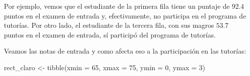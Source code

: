 \documentclass[
  letterpaper,
  DIV=11,
  numbers=noendperiod,
  oneside]{scrreprt}
\newenvironment{Shaded}{\begin{snugshade}}{\end{snugshade}}
\newcommand{\AttributeTok}[1]{\textcolor[rgb]{0.40,0.45,0.13}{#1}}
\newcommand{\DecValTok}[1]{\textcolor[rgb]{0.68,0.00,0.00}{#1}}
\newcommand{\FunctionTok}[1]{\textcolor[rgb]{0.28,0.35,0.67}{#1}}
\newcommand{\NormalTok}[1]{\textcolor[rgb]{0.00,0.23,0.31}{#1}}
\newcommand{\OtherTok}[1]{\textcolor[rgb]{0.00,0.23,0.31}{#1}}
\begin{document}
Por ejemplo, vemos que el estudiante de la primera fila tiene un puntaje
de \(92.4\) puntos en el examen de entrada y, efectivamente, no
participa en el programa de tutorías. Por otro lado, el estudiante de la
tercera fila, con sus magros \(53.7\) puntos en el examen de entrada, sí
participó del programa de tutorías.

Veamos las notas de entrada y como afecta eso a la participación en las
tutorías:

\begin{Shaded}
\begin{Highlighting}[]
\NormalTok{rect\_claro }\OtherTok{\textless{}{-}} \FunctionTok{tibble}\NormalTok{(}\AttributeTok{xmin =} \DecValTok{65}\NormalTok{, }\AttributeTok{xmax =} \DecValTok{75}\NormalTok{, }\AttributeTok{ymin =} \DecValTok{0}\NormalTok{, }\AttributeTok{ymax =} \DecValTok{3}\NormalTok{)}


\end{Highlighting}
\end{Shaded}
\end{document}
